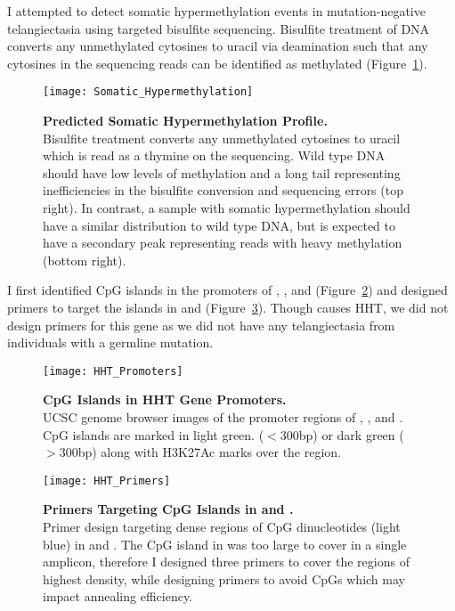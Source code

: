 I attempted to detect somatic hypermethylation events in mutation-negative telangiectasia using targeted bisulfite sequencing. Bisulfite treatment of DNA converts any unmethylated cytosines to uracil via deamination such that any cytosines in the sequencing reads can be identified as methylated (Figure~\ref{Somatic_Hypermethylation}). 
\begin{figure}[bp!]
\begin{center}
\texttt{[image: Somatic\_Hypermethylation]}
\end{center}
\caption[Predicted Somatic Hypermethylation Profile]{\textbf{Predicted Somatic Hypermethylation Profile.} \\ Bisulfite treatment converts any unmethylated cytosines to uracil which is read as a thymine on the sequencing. Wild type DNA should have low levels of methylation and a long tail representing inefficiencies in the bisulfite conversion and sequencing errors (top right). In contrast, a sample with somatic hypermethylation should have a similar distribution to wild type DNA, but is expected to have a secondary peak representing reads with heavy methylation (bottom right).}
\label{Somatic_Hypermethylation}
\end{figure}
I first identified CpG islands in the promoters of , , and  (Figure~\ref{HHT_Promoters}) and designed primers to target the islands in  and  (Figure~\ref{HHT_Primers}). Though  causes HHT, we did not design primers for this gene as we did not have any telangiectasia from individuals with a  germline mutation.
\begin{figure}[tbp!]
\begin{center}
\texttt{[image: HHT\_Promoters]}
\end{center}
\caption[CpG Islands in HHT Gene Promoters]{\textbf{CpG Islands in HHT Gene Promoters.} \\ UCSC genome browser images of the promoter regions of , , and . CpG islands are marked in light green. ($<$300bp) or dark green ($>$300bp) along with H3K27Ac marks over the region.}
\label{HHT_Promoters}
\end{figure}
\begin{figure}[tbp!]
\begin{center}
\texttt{[image: HHT\_Primers]}
\end{center}
\caption[Primers Targeting CpG Islands in  and ]{\textbf{Primers Targeting CpG Islands in  and .} \\ Primer design targeting dense regions of CpG dinucleotides (light blue) in  and . The CpG island in  was too large to cover in a single amplicon, therefore I designed three primers to cover the regions of highest density, while designing primers to avoid CpGs which may impact annealing efficiency. }
\label{HHT_Primers}
\end{figure}
